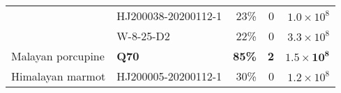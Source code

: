 \documentclass[9pt,twocolumn,twoside]{gsajnl_modified}
\begin{document}
\begin{table}
\begin{tabular}{llrrr}
                 & HJ200038-20200112-1 &                                23\% &                        0 &                     $1.0 \times 10^8$ \\
                 & W-8-25-D2 &                                22\% &                        0 &                   $3.3 \times 10^8$ \\
\cline{1-5}
Malayan porcupine & {\bf Q70} &                                {\bf 85\%} &                        {\bf 2} &                   $\mathbf{1.5 \times 10^8}$ \\
\cline{1-5}
Himalayan marmot & HJ200005-20200112-1 &                                30\% &                        0 &                   $1.2 \times 10^8$ \\
\bottomrule
\end{tabular}
\end{table}
\end{document}
